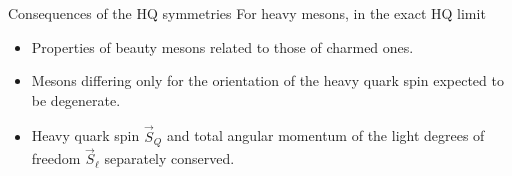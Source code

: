 \documentclass[professionalfonts,aspectratio=169]{beamer}
\begin{document}
\begin{frame}{Consequences of the HQ symmetries}
  For heavy mesons, in the exact HQ limit
  \begin{itemize}
    \pause
    \item
      Properties of beauty mesons related to those of charmed ones.
    \pause
    \item
      Mesons differing only for the orientation of the heavy quark spin expected to be degenerate.
    \pause
    \item
      Heavy quark spin $\vec{S}_Q$ and total angular momentum of the light degrees of freedom $\vec{S}_\ell$ separately conserved.
  \end{itemize}
\end{frame}
\end{document}
